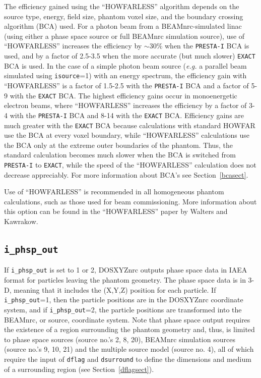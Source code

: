 \documentclass[12pt,twoside]{article}      %
\newcommand{\indexm}[1]{\index{#1}}
\begin{document}
The efficiency gained using the ``HOWFARLESS'' algorithm depends on
the source type, energy, field size, phantom voxel size, and the
boundary crossing algorithm (BCA) used.  For a photon beam from a
BEAMnrc-simulated linac (using either a phase space source or
full BEAMnrc simulation source),
use of ``HOWFARLESS'' increases the efficiency by $\sim$30\% when the
{\tt PRESTA-I} BCA is used, and by a factor of 2.5-3.5 when the more
accurate (but much slower) {\tt EXACT} BCA is used.  In the case of
a simple photon beam source ({\em e.g.} a parallel beam simulated using
{\tt isource}=1) with an energy spectrum, the efficiency gain with
``HOWFARLESS'' is a factor of 1.5-2.5 with the {\tt PRESTA-I} BCA
and a factor of 5-9 with the {\tt EXACT} BCA.  The highest efficiency
gains occur in monoenergetic electron beams, where ``HOWFARLESS''
increases the efficiency by a factor of 3-4 with the {\tt PRESTA-I}
BCA and 8-14 with the {\tt EXACT} BCA.  Efficiency gains are much
greater with the {\tt EXACT} BCA because calculations with standard
HOWFAR use the BCA at every voxel boundary, while ``HOWFARLESS''
calculations use the BCA only at the extreme outer boundaries of the phantom.
Thus, the standard calculation becomes much slower when the BCA is
switched from {\tt PRESTA-I} to {\tt EXACT}, while the speed of
the ``HOWFARLESS'' calculation does not decrease appreciably.  For
more information about BCA's see Section~\ref{bcasect}.

Use of ``HOWFARLESS'' is recommended in all homogeneous phantom calculations,
such as those used for beam commissioning.  More information about
this option can be found in the ``HOWFARLESS'' paper by
Walters and Kawrakow\cite{WK06}.

\subsection{{\tt i\_phsp\_out}}
\label{phspoutsect}
\indexm{i\_phsp\_out}
\indexm{writing phase space data}

If {\tt i\_phsp\_out} is set to 1 or 2, DOSXYZnrc outputs phase space data in IAEA format
for particles leaving the phantom geometry.  The phase space data is in 3-D, meaning
that it includes
the (X,Y,Z) position for each particle.  If {\tt i\_phsp\_out}=1, then the particle positions
are in the DOSXYZnrc coordinate system, and if {\tt i\_phsp\_out}=2, the particle positions
are transformed into the BEAMnrc, or source, coordinate system.  Note that phase space
output requires the existence of a region surrounding the phantom geometry and, thus, is limited
to phase space sources (source no.'s 2, 8, 20), BEAMnrc simulation sources (source no.'s 9, 10, 21)
and the multiple source model (source no. 4), all of which require the input of
\indexm{dflag}\indexm{dsurround}
{\tt dflag} and {\tt dsurround} to define the dimensions and medium of a surrounding region
(see Section~\ref{dflagsect}).
\end{document}
